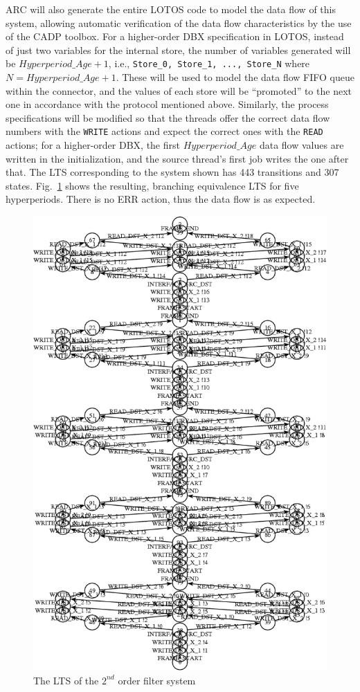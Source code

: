 ARC will also generate the entire LOTOS code to model the data flow of
this system, allowing automatic verification of the data flow
characteristics by the use of the CADP toolbox. For a higher-order DBX
specification in LOTOS, instead of just two variables for the internal
store, the number of variables generated will be $Hyperperiod\_Age+1$,
i.e., \texttt{Store\_0, Store\_1, ..., Store\_N} where
$N=Hyperperiod\_Age+1$. These will be used to model the data flow FIFO
queue within the connector, and the values of each store will be
``promoted'' to the next one in accordance with the protocol mentioned
above. Similarly, the process specifications will be modified so that
the threads offer the correct data flow numbers with the
\texttt{WRITE} actions and expect the correct ones with the
\texttt{READ} actions; for a higher-order DBX, the first
$Hyperperiod\_Age$ data flow values are written in the initialization,
and the source thread's first job writes the one after that. The LTS
corresponding to the system shown has 443 transitions and 307
states. Fig.~\ref{fig:second_order} shows the resulting, branching
equivalence LTS for five hyperperiods. There is no ERR action, thus
the data flow is as expected.

\begin{figure}
\centering
\includegraphics[scale=0.75]{figs/second_order}
\caption{The LTS of the $2^{nd}$ order filter system}
\label{fig:second_order}
\end{figure}

